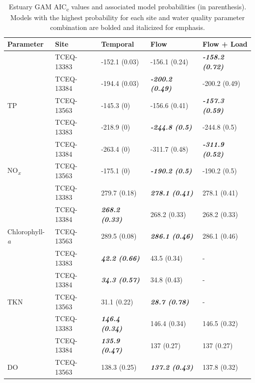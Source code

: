 \documentclass[water,article,submit,oneauthor]{Definitions/mdpi}
\begin{document}
\begin{table}[H]

\caption{\label{tab:unnamed-chunk-1}Estuary GAM AIC\textsubscript{c} values and associated model probabilities (in parenthesis). Models with the highest probability for each site and water quality parameter combination are bolded and italicized for emphasis.}
\centering
\begin{tabular}[t]{ll>{}l>{}l>{}l}
\toprule
Parameter & Site & Temporal & Flow & Flow + Load\\
\midrule
 & TCEQ-13383 & -152.1 (0.03) & -156.1 (0.24) & \em{\textbf{-158.2 (0.72)}}\\

 & TCEQ-13384 & -194.4 (0.03) & \em{\textbf{-200.2 (0.49)}} & -200.2 (0.49)\\

\multirow{-3}{*}{\raggedright\arraybackslash TP} & TCEQ-13563 & -145.3 (0) & -156.6 (0.41) & \em{\textbf{-157.3 (0.59)}}\\
\cmidrule{1-5}
 & TCEQ-13383 & -218.9 (0) & \em{\textbf{-244.8 (0.5)}} & -244.8 (0.5)\\

 & TCEQ-13384 & -263.4 (0) & -311.7 (0.48) & \em{\textbf{-311.9 (0.52)}}\\

\multirow{-3}{*}{\raggedright\arraybackslash NO\textsubscript{\emph{x}}} & TCEQ-13563 & -175.1 (0) & \em{\textbf{-190.2 (0.5)}} & -190.2 (0.5)\\
\cmidrule{1-5}
 & TCEQ-13383 & 279.7 (0.18) & \em{\textbf{278.1 (0.41)}} & 278.1 (0.41)\\

 & TCEQ-13384 & \em{\textbf{268.2 (0.33)}} & 268.2 (0.33) & 268.2 (0.33)\\

\multirow{-3}{*}{\raggedright\arraybackslash Chlorophyll-\emph{a}} & TCEQ-13563 & 289.5 (0.08) & \em{\textbf{286.1 (0.46)}} & 286.1 (0.46)\\
\cmidrule{1-5}
 & TCEQ-13383 & \em{\textbf{42.2 (0.66)}} & 43.5 (0.34) & -\\

 & TCEQ-13384 & \em{\textbf{34.3 (0.57)}} & 34.8 (0.43) & -\\

\multirow{-3}{*}{\raggedright\arraybackslash TKN} & TCEQ-13563 & 31.1 (0.22) & \em{\textbf{28.7 (0.78)}} & -\\
\cmidrule{1-5}
 & TCEQ-13383 & \em{\textbf{146.4 (0.34)}} & 146.4 (0.34) & 146.5 (0.32)\\

 & TCEQ-13384 & \em{\textbf{135.9 (0.47)}} & 137 (0.27) & 137 (0.27)\\

\multirow{-3}{*}{\raggedright\arraybackslash DO} & TCEQ-13563 & 138.3 (0.25) & \em{\textbf{137.2 (0.43)}} & 137.8 (0.32)\\
\bottomrule
\end{tabular}
\end{table}
\end{document}
